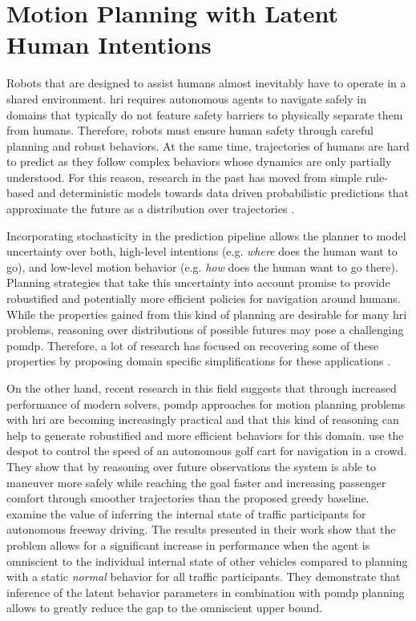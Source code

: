 \chapter{Motion Planning with Latent Human Intentions}\label{chap:hri}

Robots that are designed to assist humans almost inevitably have to operate in
a shared environment. \ac{hri} requires autonomous agents to navigate
safely in domains that typically do not feature safety barriers to physically
separate them from humans. Therefore, robots must ensure human safety through
careful planning and robust behaviors. At the same time, trajectories of humans
are hard to predict as they follow complex behaviors whose dynamics are only
partially understood. For this reason, research in the past has moved from
simple rule-based and deterministic models
\cite{helbing1995social,burstedde2001simulation} towards data driven
probabilistic predictions that approximate the future as a distribution over
trajectories \cite{kretzschmar2014learning,alahi2016social,gupta2018social}.


Incorporating stochasticity in the prediction pipeline allows the planner to
model uncertainty over both, high-level intentions (e.g. \emph{where} does the
human want to go), and low-level motion behavior (e.g. \emph{how} does the
human want to go there). Planning strategies that take this uncertainty into
account promise to provide robustified and potentially more efficient policies
for navigation around humans. While the properties gained from this kind of
planning are desirable for many \ac{hri} problems, reasoning over distributions
of possible futures may pose a challenging \ac{pomdp}. Therefore, a lot of
research has focused on recovering some of these properties by proposing domain
specific simplifications for these applications \cite{fern2007decision,
sadigh2016information, javdani2018shared, fisac2018probabilistically}.

On the other hand, recent research in this field suggests that through
increased performance of modern solvers, \ac{pomdp} approaches for motion
planning problems with \ac{hri} are becoming increasingly practical and that
this kind of reasoning can help to generate robustified and more efficient
behaviors for this domain. \cite{bai2015intention} use the \ac{despot} to
control the speed of an autonomous golf cart for navigation in a crowd. They
show that by reasoning over future observations the system is able to maneuver
more safely while reaching the goal faster and increasing passenger comfort
through smoother trajectories than the proposed greedy baseline.
\cite{sunberg2017value} examine the value of inferring the internal state of
traffic participants for autonomous freeway driving. The results presented in
their work show that the problem allows for a significant increase in
performance when the agent is omniscient to the individual internal state of
other vehicles compared to planning with a static \emph{normal} behavior for
all traffic participants. They demonstrate that inference of the latent
behavior parameters in combination with \ac{pomdp} planning allows to greatly
reduce the gap to the omniscient upper bound.

